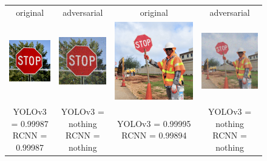 \documentclass{article}
\begin{document}
\begin{figure}[h]
\centering
    \begin{tabular}{c c@{\hskip 1cm} c c}
        original & adversarial & original & adversarial \\
        \includegraphics[width=0.2\linewidth]{../test_images/stop.png} &  \includegraphics[width=0.2\linewidth]{../test_images/ensemble_adversarials/stop.png} & 
        \includegraphics[width=0.2\linewidth]{../test_images/stop2.png} &  \includegraphics[width=0.2\linewidth]{../test_images/ensemble_adversarials/stop2.png} \\

        \makecell[t]{YOLOv3 = 0.99987 \\ RCNN = 0.99987} & \makecell[t]{YOLOv3 = nothing \\ RCNN = nothing} & \makecell[t]{YOLOv3 = 0.99995 \\ RCNN = 0.99894} & \makecell[t]{YOLOv3 = nothing \\ RCNN = nothing} \\[1cm]


\end{tabular}
\end{figure}
\end{document}
